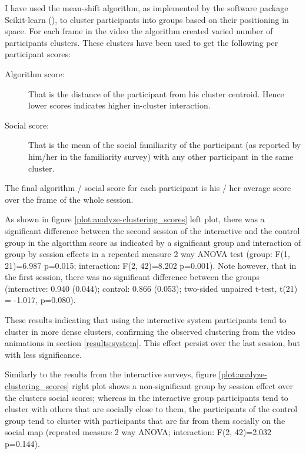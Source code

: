 \documentclass[a4paper,11pt]{article}
\begin{document}
I have used the mean-shift algorithm, as implemented by the software package Scikit-learn (\cite{scikit-learn}), to cluster participants into groups based on their positioning in space.
For each frame in the video the algorithm created varied number of participants clusters.
These clusters have been used to get the following per participant scores:

\begin{description}
    \item[Algorithm score:] That is the distance of the participant from his cluster centroid.
        Hence lower scores indicates higher in-cluster interaction. \label{results:algorithm_score}
    \item[Social score:] That is the mean of the social familiarity of the participant (as reported by him/her in the familiarity survey) with any other participant in the same cluster. \label{results:social_score}
\end{description}

The final algorithm / social score for each participant is his / her average score over the frame of the whole session.

As shown in figure \ref{plot:analyze-clustering_scores} left plot, there was a significant difference between the second session of the interactive and the control group in the algorithm score as indicated by a significant group and interaction of group by session effects in a repeated measure 2 way ANOVA test (group: F(1, 21)=6.987 p=0.015; interaction: F(2, 42)=8.202 p=0.001).
Note however, that in the first session, there was no significant difference between the groups (interactive: 0.940 (0.044); control: 0.866 (0.053); two-sided unpaired t-test, t(21) = -1.017, p=0.080).

These results indicating that using the interactive system participants tend to cluster in more dense clusters, confirming the observed clustering from the video animations in section \ref{results:system}.
This effect persist over the last session, but with less significance.

Similarly to the results from the interactive surveys, figure \ref{plot:analyze-clustering_scores} right plot shows a non-significant group by session effect over the clusters social scores; whereas in the interactive group participants tend to cluster with others that are socially close to them, the participants of the control group tend to cluster with participants that are far from them socially on the social map (repeated measure 2 way ANOVA; interaction: F(2, 42)=2.032 p=0.144).
\end{document}
